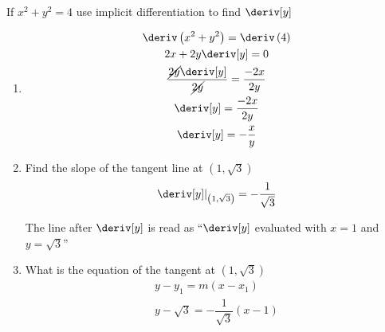 \begin{example}
    If $x^2 + y^2 = 4$ use implicit differentiation to find $\deriv[y]$
    \begin{enumerate}[a\symbol{41}] %
        \item \begin{gather*}
            \deriv \left(x^2 + y^2\right) = \deriv \left(4\right) \\
            2x + 2y\deriv[y] = 0 \\
            \dfrac{\cancel{2y}\deriv[y]}{\cancel{2y}} = \dfrac{-2x}{2y} \\
            \deriv[y] = \dfrac{-2x}{2y} \\
            \deriv[y] = -\dfrac{x}{y}
        \end{gather*}
        \item Find the slope of the tangent line at $\left(1, \sqrt{3}\right)$ \\
        \begin{equation*}
            \Eval{\deriv[y]}{\left(1, \sqrt{3}\right)} = - \dfrac{1}{\sqrt{3}}
        \end{equation*}
        \begin{note}
            The line after $\deriv[y]$ is read as ``$\deriv[y]$ evaluated with $ x= 1$ and $y = \sqrt{3}$''
        \end{note}
        \item What is the equation of the tangent at $\left(1, \sqrt{3}\right)$
        \begin{gather*}
            y - y_1 = m\left(x - x_1\right) \\
            y - \sqrt{3} = - \dfrac{1}{\sqrt{3}}\left(x - 1\right)
        \end{gather*}
    \end{enumerate}
\end{example}

